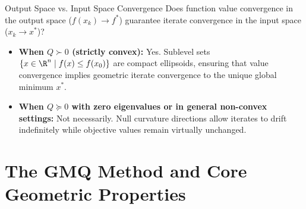 \begin{noteblock}{Output Space vs. Input Space Convergence}
Does function value convergence in the output space ($f(x_k) \to f^*$) guarantee iterate convergence in the input space ($x_k \to x^*$)?
\begin{itemize}
    \item \textbf{When $Q \succ 0$ (strictly convex):} Yes. Sublevel sets $\{x \in \R^n \mid f(x) \le f(x_0)\}$ are compact ellipsoids, ensuring that value convergence implies geometric iterate convergence to the unique global minimum $x^*$.
    \item \textbf{When $Q \succeq 0$ with zero eigenvalues or in general non-convex settings:} Not necessarily. Null curvature directions allow iterates to drift indefinitely while objective values remain virtually unchanged.
\end{itemize}
\end{noteblock}

\FloatBarrier
\section{The GMQ Method and Core Geometric Properties}
\label{sec:gradient-method-exact-line-search}

